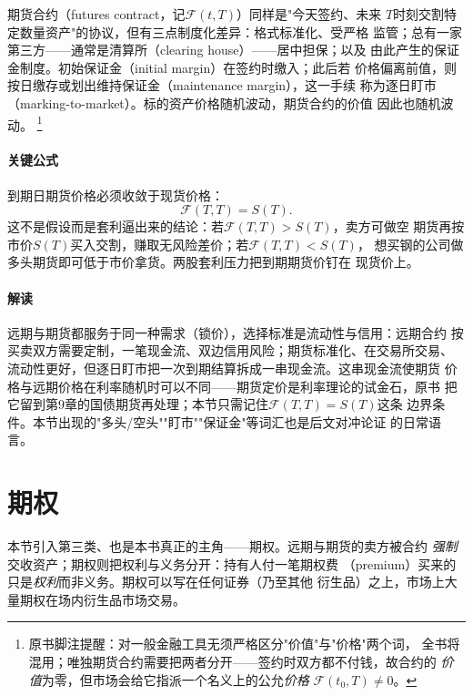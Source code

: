 期货合约（futures contract，记$\mathcal{F}(t,T)$）同样是"今天签约、未来
$T$时刻交割特定数量资产"的协议，但有三点制度化差异：格式标准化、受严格
监管；总有一家第三方——通常是清算所（clearing house）——居中担保；以及
由此产生的保证金制度。初始保证金（initial margin）在签约时缴入；此后若
价格偏离前值，则按日缴存或划出维持保证金（maintenance margin），这一手续
称为逐日盯市（marking-to-market）。标的资产价格随机波动，期货合约的价值
因此也随机波动。
\footnote{原书脚注提醒：对一般金融工具无须严格区分"价值"与"价格"两个词，
全书将混用；唯独期货合约需要把两者分开——签约时双方都不付钱，故合约的
\emph{价值}为零，但市场会给它指派一个名义上的公允\emph{价格}
$\mathcal{F}(t_0,T)\neq 0$。}

\paragraph{关键公式}
到期日期货价格必须收敛于现货价格：
\begin{equation*}
\mathcal{F}(T,T)=S(T).
\end{equation*}
这不是假设而是套利逼出来的结论：若$\mathcal{F}(T,T)>S(T)$，卖方可做空
期货再按市价$S(T)$买入交割，赚取无风险差价；若$\mathcal{F}(T,T)<S(T)$，
想买钢的公司做多头期货即可低于市价拿货。两股套利压力把到期期货价钉在
现货价上。


\paragraph{解读}
远期与期货都服务于同一种需求（锁价），选择标准是流动性与信用：远期合约
按买卖双方需要定制，一笔现金流、双边信用风险；期货标准化、在交易所交易、
流动性更好，但逐日盯市把一次到期结算拆成一串现金流。这串现金流使期货
价格与远期价格在利率随机时可以不同——期货定价是利率理论的试金石，原书
把它留到第9章的国债期货再处理；本节只需记住$\mathcal{F}(T,T)=S(T)$这条
边界条件。本节出现的"多头/空头""盯市""保证金"等词汇也是后文对冲论证
的日常语言。

\section{期权}

本节引入第三类、也是本书真正的主角——期权。远期与期货的卖方被合约
\emph{强制}交收资产；期权则把权利与义务分开：持有人付一笔期权费
（premium）买来的只是\emph{权利}而非义务。期权可以写在任何证券（乃至其他
衍生品）之上，市场上大量期权在场内衍生品市场交易。

